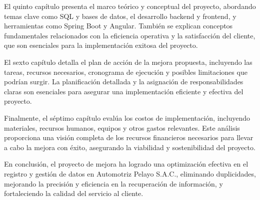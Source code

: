 El quinto capítulo presenta el marco teórico y conceptual del proyecto, abordando temas clave como SQL y bases de datos, el desarrollo backend y frontend, y herramientas como Spring Boot y Angular. También se explican conceptos fundamentales relacionados con la eficiencia operativa y la satisfacción del cliente, que son esenciales para la implementación exitosa del proyecto.

El sexto capítulo detalla el plan de acción de la mejora propuesta, incluyendo las tareas, recursos necesarios, cronograma de ejecución y posibles limitaciones que podrían surgir. La planificación detallada y la asignación de responsabilidades claras son esenciales para asegurar una implementación eficiente y efectiva del proyecto.

Finalmente, el séptimo capítulo evalúa los costos de implementación, incluyendo materiales, recursos humanos, equipos y otros gastos relevantes. Este análisis proporciona una visión completa de los recursos financieros necesarios para llevar a cabo la mejora con éxito, asegurando la viabilidad y sostenibilidad del proyecto.

En conclusión, el proyecto de mejora ha logrado una optimización efectiva en el registro y gestión de datos en Automotriz Pelayo S.A.C., eliminando duplicidades, mejorando la precisión y eficiencia en la recuperación de información, y fortaleciendo la calidad del servicio al cliente.


